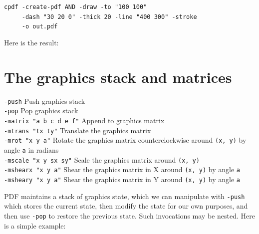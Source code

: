 \documentclass{book}
\begin{document}
\begin{framed}
 \noindent\small\verb?cpdf -create-pdf AND -draw -to "100 100"?\\
 \noindent\small\verb?     -dash "30 20 0" -thick 20 -line "400 300" -stroke?\\
 \noindent\small\verb?     -o out.pdf?
\end{framed}

\noindent Here is the result:

\bigskip
{}
\bigskip

\section{The graphics stack and matrices}
  {\small\begin{framed}
   \noindent\verb!-push! Push graphics stack\\
   \noindent\verb!-pop! Pop graphics stack\\
   \noindent\verb!-matrix "a b c d e f"! Append to graphics matrix\\
   \noindent\verb!-mtrans "tx ty"! Translate the graphics matrix\\
   \noindent\verb!-mrot "x y a"! Rotate the graphics matrix counterclockwise around \texttt{(x, y)} by angle \texttt{a} in radians\\
   \noindent\verb!-mscale "x y sx sy"! Scale the graphics matrix around \texttt{(x, y)}\\
   \noindent\verb!-mshearx "x y a"! Shear the graphics matrix in X around \texttt{(x, y)} by angle \texttt{a}\\
   \noindent\verb!-msheary "x y a"! Shear the graphics matrix in Y around \texttt{(x, y)} by angle \texttt{a}
  \end{framed}}

PDF maintains a stack of graphics state, which we can manipulate with \texttt{-push} which stores the current state, then modify the state for our own purposes, and then use \texttt{-pop} to restore the previous state. Such invocations may be nested. Here is a simple example:
 
\end{document}
